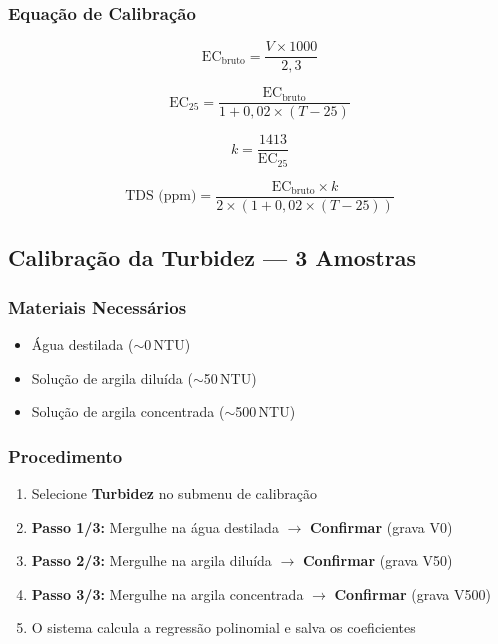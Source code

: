 \documentclass[12pt,a4paper]{article}
\begin{document}
\subsubsection{Equação de Calibração}

\begin{equation}
  \text{EC}_{\text{bruto}} = \frac{V \times 1000}{2{,}3}
  \label{eq:ec}
\end{equation}

\begin{equation}
  \text{EC}_{25} = \frac{\text{EC}_{\text{bruto}}}{1 + 0{,}02 \times (T - 25)}
  \label{eq:ec25}
\end{equation}

\begin{equation}
  k = \frac{1413}{\text{EC}_{25}}
  \label{eq:k}
\end{equation}

\begin{equation}
  \text{TDS (ppm)} = \frac{\text{EC}_{\text{bruto}} \times k}{2 \times (1 + 0{,}02 \times (T - 25))}
  \label{eq:tds}
\end{equation}

\subsection{Calibração da Turbidez --- 3 Amostras}

\subsubsection{Materiais Necessários}
\begin{itemize}[nosep]
  \item Água destilada ($\sim$0\,NTU)
  \item Solução de argila diluída ($\sim$50\,NTU)
  \item Solução de argila concentrada ($\sim$500\,NTU)
\end{itemize}

\subsubsection{Procedimento}

\begin{enumerate}[nosep]
  \item Selecione \textbf{Turbidez} no submenu de calibração
  \item \textbf{Passo 1/3:} Mergulhe na água destilada $\rightarrow$ \textbf{Confirmar} (grava V0)
  \item \textbf{Passo 2/3:} Mergulhe na argila diluída $\rightarrow$ \textbf{Confirmar} (grava V50)
  \item \textbf{Passo 3/3:} Mergulhe na argila concentrada $\rightarrow$ \textbf{Confirmar} (grava V500)
  \item O sistema calcula a regressão polinomial e salva os coeficientes
\end{enumerate}
\end{document}
